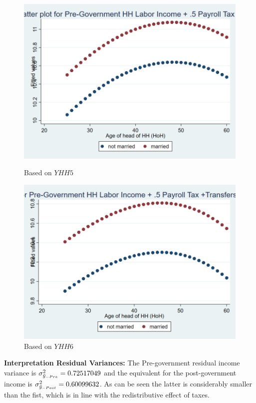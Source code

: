 \documentclass[12pt,a4paper]{article}
\begin{document}
\begin{figure}[h]
  \centering
  \begin{minipage}[b]{0.45\textwidth}
    \includegraphics[width=\textwidth]{stata_output/smoothed_yy5_hat.png}
    \caption{Based on $YHH5$}
  \end{minipage}
  \hfill
  \begin{minipage}[b]{0.45\textwidth}
    \includegraphics[width=\textwidth]{stata_output/smoothed_yy6_hat.png}
    \caption{Based on $YHH6$}
  \end{minipage}
\end{figure}

\textbf{Interpretation Residual Variances:} The Pre-government residual income variance is $\sigma^2_{\Tilde{y}_{-Pre}} = 0.72517049$ and the equivalent for the post-government income is $\sigma^2_{\Tilde{y}_{-Post}} = 0.60099632$. As can be seen the latter is considerably smaller than the fist, which is in line with the redistributive effect of taxes. 
\end{document}

